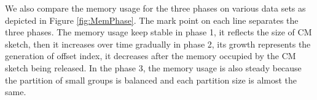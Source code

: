 We also compare the memory usage for the three phases on various data sets as depicted in Figure \ref{fig:MemPhase}. The mark point on each line separates the three phases. The memory usage keep stable in phase 1, it reflects the size of CM sketch, then it increases over time gradually in phase 2, its growth represents the generation of offset index, it decreases after the memory occupied by the CM sketch being released. In the phase 3, the memory usage is also steady because the partition of small groups is balanced and each partition size is almost the same.




